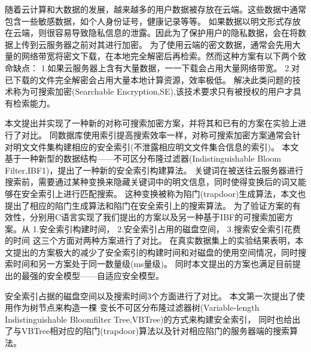 
\setcounter{page}{1}

随着云计算和大数据的发展，越来越多的用户数据被存放在云端。这些数据中通常包含一些敏感数据，如个人身份证号，健康记录等等。
如果数据以明文形式存放在云端，则很容易导致隐私信息的泄露。因此为了保护用户的隐私数据，会在将数据上传到云服务器之前对其进行加密。
为了使用云端的密文数据，通常会先用大量的网络带宽将密文下载，在本地完全解密后再检索。然而这种方案有以下两个致命缺点：
1.如果云服务器上含有大量数据，一一下载会占用大量网络带宽。
2.对已下载的文件完全解密会占用大量本地计算资源，效率极低。
解决此类问题的技术称为可搜索加密(Searchable Encryption,SE),该技术要求只有被授权的用户才具有检索能力。

本文提出并实现了一种新的对称可搜索加密方案，并将其和已有的方案在实验上进行了对比。
同数据库使用索引提高搜索效率一样，对称可搜索加密方案通常会针对明文文件集构建相应的安全索引(不泄露相应明文文件集合信息的索引)。
本文基于一种新型的数据结构——不可区分布隆过滤器(Indistinguishable Bloom Filter,IBF1)\cite{adaptive}，提出了一种新的安全索引构建算法。
关键词在被送往云服务器进行搜索前，需要通过某种变换来隐藏关键词中的明文信息，同时使得变换后的词又能够在安全索引上进行匹配搜索。
这种变换被称为陷门(trapdoor)生成算法，本文也提出了相应的陷门生成算法和陷门在安全索引上的搜索算法。
为了验证方案的有效性，分别用C语言实现了我们提出的方案以及另一种基于IBF的可搜索加密方案。从
1.安全索引构建时间，
2.安全索引占用的磁盘空间，
3.搜索安全索引花费的时间
这三个方面对两种方案进行了对比。
在真实数据集上的实验结果表明，本文提出的方案极大的减少了安全索引的构建时间和对磁盘的使用空间情况，同时搜索时间和另一方案处于同一数量级(ms量级)。
同时本文提出的方案也满足目前提出的最强的安全模型——自适应安全模型。

安全索引占据的磁盘空间以及搜索时间3个方面进行了对比。
本文第一次提出了使用作为树节点来构造一棵
变长不可区分布隆过滤器树(Variable-length Indistinguishable Bloomfilter Tree,VBTree)的方式来构建安全索引，
同时也给出了与VBTree相对应的陷门(trapdoor)算法以及针对相应陷门的服务器端的搜索算法。





